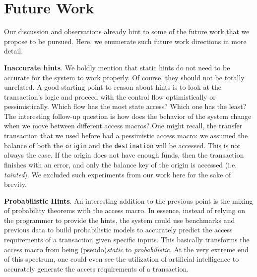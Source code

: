 \section{Future Work} \label{chap_conc:sec:future_work}

Our discussion and observations already hint to some of the future work that we propose to be
pursued. Here, we enumerate such future work directions in more detail.

\textbf{Inaccurate hints}. We boldly mention that static hints do not need to be accurate for the
system to work properly. Of course, they should not be totally unrelated. A good starting point to
reason about hints is to look at the transaction's logic and proceed with the control flow
optimistically or pessimistically. Which flow has the most state access? Which one has the least?
The interesting follow-up question is how does the behavior of the system change when we move
between different access macros? One might recall, the transfer transaction that we used before had
a pessimistic access macro: we assumed the balance of both the \texttt{origin} and the
\texttt{destination} will be accessed. This is not always the case. If the origin does not have
enough funds, then the transaction finishes with an error, and only the balance key of the origin is
accessed (i.e. \textit{tainted}). We excluded such experiments from our work here for the sake of
brevity.

\textbf{Probabilistic Hints}. An interesting addition to the previous point is the mixing of
probability theorems with the access macro. In essence, instead of relying on the programmer to
provide the hints, the system could use benchmarks and previous data to build probabilistic models
to accurately predict the access requirements of a transaction given specific inputs.  This
basically transforms the access macro from being (pseudo)\textit{static} to \textit{probabilistic}.
At the very extreme end of this spectrum, one could even see the utilization of artificial
intelligence to accurately generate the access requirements of a transaction.

